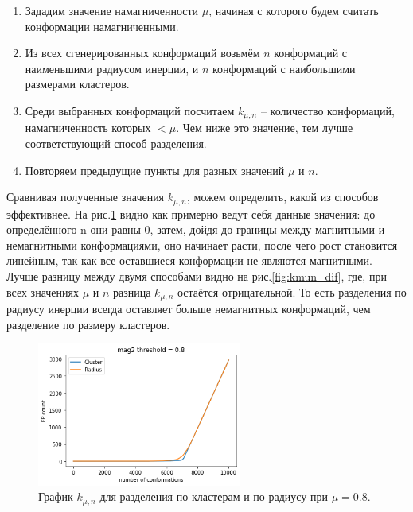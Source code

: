 \begin{enumerate}
	\item Зададим значение намагниченности $\mu$, начиная с которого будем считать конформации намагниченными.
	\item Из всех сгенерированных конформаций возьмём $n$ конформаций с наименьшими радиусом инерции, и $n$ конформаций с наибольшими размерами кластеров.
	\item Среди выбранных конформаций посчитаем $k_{\mu, n}$ -- количество конформаций, намагниченность которых $< \mu$. Чем ниже это значение, тем лучше соответствующий способ разделения.
	\item Повторяем предыдущие пункты для разных значений $\mu$ и $n$.
\end{enumerate}

Сравнивая полученные значения $k_{\mu, n}$, можем определить, какой из способов эффективнее. На рис.\ref{fig:kmun_example} видно как примерно ведут себя данные значения: до определённого n они равны 0, затем, дойдя до границы между магнитными и немагнитными конформациями, оно начинает расти, после чего рост становится линейным, так как все оставшиеся конформации не являются магнитными. 
Лучше разницу между двумя способами видно на рис.\ref{fig:kmun_dif}, где, при всех значениях $\mu$ и $n$ разница $k_{\mu, n}$ остаётся отрицательной. То есть разделения по радиусу инерции всегда оставляет больше немагнитных конформаций, чем разделение по размеру кластеров.

\begin{figure}[H]
	\centering
	\includegraphics[width=0.6\textwidth]{../images/cluster_and_radius_mu0.8.png} 
	\caption{График $k_{\mu, n}$ для разделения по кластерам и по радиусу при $\mu = 0.8$.}
	\label{fig:kmun_example}
\end{figure}

